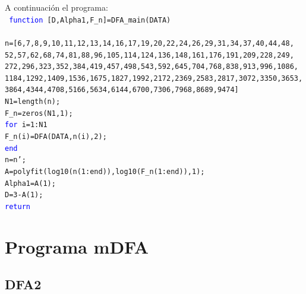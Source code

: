 \documentclass[letterpaper,titlepage,12pt,draft]{report}
\begin{document}
A continuaci\'on el programa:\\

{\tt \setlength{\parindent}{0pt} \textcolor{blue}{function} [D,Alpha1,F\_n]=DFA\_main(DATA)\\
\\
n=[6,7,8,9,10,11,12,13,14,16,17,19,20,22,24,26,29,31,34,37,40,44,48,
52,57,62,68,74,81,88,96,105,114,124,136,148,161,176,191,209,228,249,
272,296,323,352,384,419,457,498,543,592,645,704,768,838,913,996,1086,
1184,1292,1409,1536,1675,1827,1992,2172,2369,2583,2817,3072,3350,3653,
3864,4344,4708,5166,5634,6144,6700,7306,7968,8689,9474]
\\
N1=length(n);\\
F\_n=zeros(N1,1);\\
\textcolor{blue}{for} i=1:N1\\
F\_n(i)=DFA(DATA,n(i),2);\\
\textcolor{blue}{end}\\
n=n';\\
A=polyfit(log10(n(1:end)),log10(F\_n(1:end)),1);\\
Alpha1=A(1);\\
D=3-A(1);\\
\textcolor{blue}{return}\\
}

\section{Programa mDFA}

\subsection{DFA2}
\end{document}
